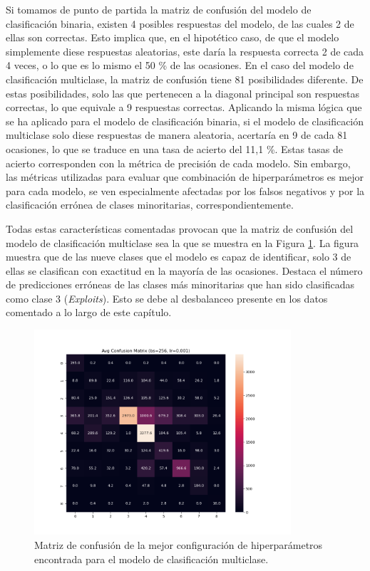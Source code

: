 \begin{enumerate}
	Si tomamos de punto de partida la matriz de confusión del modelo de clasificación binaria, existen 4 posibles respuestas del modelo, de las cuales 2 de ellas son correctas. Esto implica que, en el hipotético caso, de que el modelo simplemente diese respuestas aleatorias, este daría la respuesta correcta 2 de cada 4 veces, o lo que es lo mismo el 50 \% de las ocasiones. En el caso del modelo de clasificación multiclase, la matriz de confusión tiene 81 posibilidades diferente. De estas posibilidades, solo las que pertenecen a la diagonal principal son respuestas correctas, lo que equivale a 9 respuestas correctas. Aplicando la misma lógica que se ha aplicado para el modelo de clasificación binaria, si el modelo de clasificación multiclase solo diese respuestas de manera aleatoria, acertaría en 9 de cada 81 ocasiones, lo que se traduce en una tasa de acierto del 11,1 \%. Estas tasas de acierto corresponden con la métrica de precisión de cada modelo. Sin embargo, las métricas utilizadas para evaluar que combinación de hiperparámetros es mejor para cada modelo, se ven especialmente afectadas por los falsos negativos y por la clasificación errónea de clases minoritarias, correspondientemente.
\end{enumerate}

Todas estas características comentadas provocan que la matriz de confusión del modelo de clasificación multiclase sea la que se muestra en la Figura \ref{fig:MCMUL}. La figura muestra que de las nueve clases que el modelo es capaz de identificar, solo 3 de ellas se clasifican con exactitud en la mayoría de las ocasiones. Destaca el número de predicciones erróneas de las clases más minoritarias que han sido clasificadas como clase 3 (\textit{Exploits}). Esto se debe al desbalanceo presente en los datos comentado a lo largo de este capítulo.


\begin{figure}[H]
    \centering
    \includegraphics[width=0.85\textwidth]{./img/modelo/MCMUL.png}
    \caption{Matriz de confusión de la mejor configuración de hiperparámetros encontrada  para el modelo de clasificación multiclase.}
    \label{fig:MCMUL}
\end{figure}

